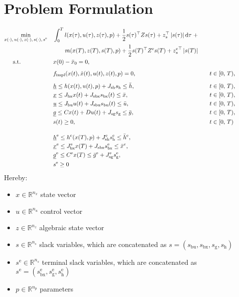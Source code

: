 \documentclass{article}
\newcommand{\tran}{^\top}
\newcommand{\abs}[1]{\left\lvert#1\right\rvert}
\newcommand{\ind}[1]{_{\textrm{#1}}}
\newcommand{\terminal}{^{\textrm{e}}}
\begin{document}
\section*{Problem Formulation}

\begin{align*}
&\underset{\begin{subarray}{c}
	x(\cdot),\,u(\cdot), \, z(\cdot), \, s(\cdot), \, s\terminal
	\end{subarray}}{\min}
&&\int_0^T l(x(\tau), u(\tau), z(\tau), p)
 + \frac{1}{2} s(\tau)\tran Z s(\tau) + z_s\tran \abs{s(\tau)} \mathrm{d}\tau \; + \\
 &&& \quad \quad m(x(T), z(T), s(T), p) + \frac{1}{2} s(T)\tran Z\terminal s(T) + {z\terminal_s}\tran \abs{s(T)}\\
&\,\,\,\quad \text{s.t.}    &&x(0) - \bar{x}_0 = 0, &&\\
&&& && \\[-1em]
&&& f\ind{impl}(x(t), \dot{x}(t), u(t), z(t), p) = 0, &&\quad t \in [0,\,T),\\
&&& && \\[-1em]
&&&\underline{h} \leq h(x(t), u(t), p) + J_{\textrm{sh}} s_{\textrm{h}} \leq \bar{h}, &&\quad t \in [0,\,T),\\
&&&\underline{x} \leq J_{\textrm{bx}} x(t) + J_{\textrm{sbx}} s_{\textrm{bx}}(t) \leq \bar{x}, &&\quad t \in [0,\,T),\\
&&&\underline{u} \leq J_{\textrm{bu}} u(t) + J_{\textrm{sbu}} s_{\textrm{bu}}(t)\leq \bar{u}, &&\quad t \in [0,\,T),\\
&&&\underline{g} \leq Cx(t) + Du(t) + J_{\textrm{sg}} s_{\textrm{g}} \leq \bar{g}, &&\quad t \in [0,\,T), \\
&&& s(t) \geq 0, && \quad t \in [0,\,T)
&&& && \\[1em]
&&&\underline{h}\terminal \leq h\terminal(x(T), p)  + J\ind{sh}\terminal s\ind{h}\terminal \leq \bar{h}\terminal, &&\\
&&&\underline{x}\terminal \leq J_{\textrm{bx}}\terminal x(T) + J\ind{sbx} s\ind{bx}\terminal \leq \bar{x}^{e}, &&\\ %
&&&\underline{g}\terminal \leq C\terminal x(T)\leq \bar{g}\terminal  + J\ind{sg}\terminal s\ind{g}\terminal, \\
&&& s\terminal \geq 0
\end{align*}
Hereby:
\begin{itemize}
	\item $ x \in \mathbb{R}^{n_x} $ state vector
	\item $ u \in \mathbb{R}^{n_u} $ control vector
	\item $ z \in \mathbb{R}^{n_z} $ algebraic state vector
	\item $ s \in \mathbb{R}^{n_s} $ slack variables, which are concatenated as $ s = (s\ind{bu}, s\ind{bx}, s\ind{g}, s\ind{h}) $
	\item $ s\terminal \in \mathbb{R}^{n_s} $ terminal slack variables, which are concatenated as $ s\terminal = (s\ind{bx}\terminal, s\ind{g}\terminal, s\ind{h}\terminal) $
	\item $ p \in \mathbb{R}^{n_p} $ parameters
\end{itemize}
\end{document}
